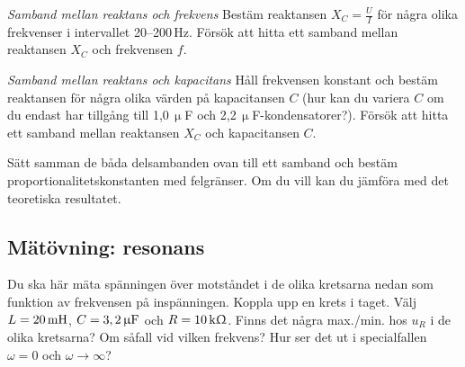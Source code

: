 \documentclass[a4paper,11pt]{article}
\begin{document}
\emph{Samband mellan reaktans och frekvens} Bestäm reaktansen 
$X_{C}=\frac{U}{I}$ för några olika frekvenser i intervallet 20--200\,Hz. Försök
att hitta ett samband mellan reaktansen $X_{C}$ och frekvensen $f$. 

\emph{Samband mellan reaktans och kapacitans} Håll frekvensen konstant
och bestäm reaktansen för några olika värden på kapacitansen $C$ (hur
kan du variera $C$ om du endast har tillgång till 1,0\,$\upmu$F och 
2,2\,$\upmu$F-kondensatorer?).  Försök att hitta ett samband mellan
reaktansen $X_{C}$ och kapacitansen $C$.

Sätt samman de båda delsambanden ovan till ett samband och bestäm 
proportionalitetskonstanten med felgränser. Om du vill kan du jämföra med det teoretiska resultatet.







\subsection*{Mätövning: resonans}

Du ska här mäta spänningen över motståndet i de olika kretsarna nedan som
funktion av frekvensen på inspänningen. Koppla upp en krets i taget. Välj
$L=\unit[20]{mH}$, $C=\unit[3,2]{\upmu F}$ och $R=\unit[10]{k\Upomega}$. Finns
det några max./min. hos $u_R$ i de olika kretsarna? Om såfall vid vilken frekvens? Hur ser det ut i specialfallen $\omega = 0$ och $\omega \rightarrow \infty$?

\begin{figure}[h]
	\centering
        \resizebox{0.65\textwidth}{!}{}
\end{figure}
\end{document}
